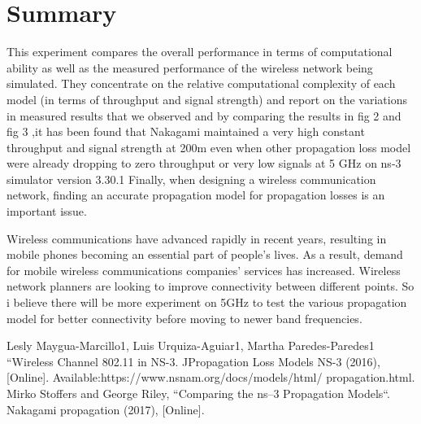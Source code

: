 \documentclass[conference]{IEEEtran}
\begin{document}
\section{Summary}
This experiment compares the overall performance in terms of computational ability as well as the measured performance of the wireless network being simulated. They concentrate on the relative computational complexity of each model (in terms of throughput and signal strength) and report on the variations in measured results that we observed and by comparing the results in fig 2 and fig 3 ,it has been found that Nakagami maintained a very high constant throughput and signal strength at 200m even when other propagation loss model were already dropping to zero throughput or very low signals  at 5 GHz on ns-3 simulator version 3.30.1
Finally, when designing a wireless communication network, finding an accurate propagation model for propagation losses is an important issue.

Wireless communications have advanced rapidly in recent years, resulting in mobile phones becoming an essential part of people's lives. As a result, demand for mobile wireless communications companies' services has increased. Wireless network planners
are looking to improve connectivity between different points. So i believe there will be more experiment on 5GHz to test the various propagation model for  better connectivity before moving to newer band frequencies.





\begin{thebibliography}{00}
 Lesly Maygua-Marcillo1, Luis Urquiza-Aguiar1, Martha Paredes-Paredes1 ``Wireless Channel 802.11 in NS-3.
 JPropagation Loss Models NS-3 (2016), [Online]. Available:https://www.nsnam.org/docs/models/html/
propagation.html.
 Mirko Stoffers and George Riley, ``Comparing the ns–3 Propagation Models``.
 Nakagami propagation (2017), [Online]. 

\end{thebibliography}
\end{document}
